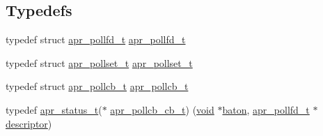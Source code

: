 \subsection*{Typedefs}
\begin{DoxyCompactItemize}
\item 
typedef struct \hyperlink{structapr__pollfd__t}{apr\+\_\+pollfd\+\_\+t} \hyperlink{group__apr__poll_ga0c89b184cbe2337e44207f1ad245129b}{apr\+\_\+pollfd\+\_\+t}
\item 
typedef struct \hyperlink{structapr__pollset__t}{apr\+\_\+pollset\+\_\+t} \hyperlink{group__apr__poll_ga680da1f10ac5ef75efc503a9d15b8906}{apr\+\_\+pollset\+\_\+t}
\item 
typedef struct \hyperlink{structapr__pollcb__t}{apr\+\_\+pollcb\+\_\+t} \hyperlink{group__apr__poll_gae382e39bdf0c5a02fca7da3944bece08}{apr\+\_\+pollcb\+\_\+t}
\item 
typedef \hyperlink{group__apr__errno_gaa5105fa83cc322f09382292db8b47593}{apr\+\_\+status\+\_\+t}($\ast$ \hyperlink{group__apr__poll_ga1dcd8c87e233dbf105e83d50ef601f55}{apr\+\_\+pollcb\+\_\+cb\+\_\+t}) (\hyperlink{group__MOD__ISAPI_gacd6cdbf73df3d9eed42fa493d9b621a6}{void} $\ast$\hyperlink{group__APR__Util__RC_ga37840dc44e2b0b5a127a6828fffe2a8c}{baton}, \hyperlink{structapr__pollfd__t}{apr\+\_\+pollfd\+\_\+t} $\ast$\hyperlink{group__apr__poll_ga93f9312d40401caaec1865013fe2bf61}{descriptor})
\end{DoxyCompactItemize}
